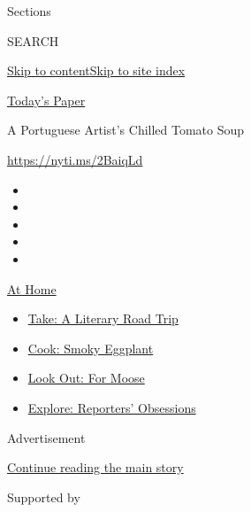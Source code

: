 Sections

SEARCH

\protect\hyperlink{site-content}{Skip to
content}\protect\hyperlink{site-index}{Skip to site index}

\href{https://myaccount.nytimes.com/auth/login?response_type=cookie\&client_id=vi}{}

\href{https://www.nytimes.com/section/todayspaper}{Today's Paper}

A Portuguese Artist's Chilled Tomato Soup

\url{https://nyti.ms/2BaiqLd}

\begin{itemize}
\item
\item
\item
\item
\item
\end{itemize}

\href{https://www.nytimes.com/spotlight/at-home?action=click\&pgtype=Article\&state=default\&region=TOP_BANNER\&context=at_home_menu}{At
Home}

\begin{itemize}
\tightlist
\item
  \href{https://www.nytimes.com/2020/07/28/books/time-for-a-literary-road-trip.html?action=click\&pgtype=Article\&state=default\&region=TOP_BANNER\&context=at_home_menu}{Take:
  A Literary Road Trip}
\item
  \href{https://www.nytimes.com/2020/07/29/magazine/bored-with-your-home-cooking-some-smoky-eggplant-will-fix-that.html?action=click\&pgtype=Article\&state=default\&region=TOP_BANNER\&context=at_home_menu}{Cook:
  Smoky Eggplant}
\item
  \href{https://www.nytimes.com/2020/07/27/travel/moose-michigan-isle-royale.html?action=click\&pgtype=Article\&state=default\&region=TOP_BANNER\&context=at_home_menu}{Look
  Out: For Moose}
\item
  \href{https://www.nytimes.com/interactive/2020/at-home/even-more-reporters-editors-diaries-lists-recommendations.html?action=click\&pgtype=Article\&state=default\&region=TOP_BANNER\&context=at_home_menu}{Explore:
  Reporters' Obsessions}
\end{itemize}

Advertisement

\protect\hyperlink{after-top}{Continue reading the main story}

Supported by

